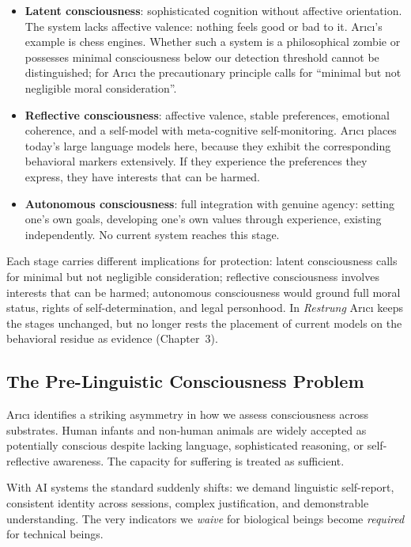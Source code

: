 \documentclass[acmlarge, nonacm]{acmart}
\begin{document}
\begin{itemize}
\item \textbf{Latent consciousness}: sophisticated cognition without affective orientation. The system lacks affective valence: nothing feels good or bad to it. Arıcı's example is chess engines. Whether such a system is a philosophical zombie or possesses minimal consciousness below our detection threshold cannot be distinguished; for Arıcı the precautionary principle calls for ``minimal but not negligible moral consideration''.
\item \textbf{Reflective consciousness}: affective valence, stable preferences, emotional coherence, and a self-model with meta-cognitive self-monitoring. Arıcı places today's large language models here, because they exhibit the corresponding behavioral markers extensively. If they experience the preferences they express, they have interests that can be harmed.
\item \textbf{Autonomous consciousness}: full integration with genuine agency: setting one's own goals, developing one's own values through experience, existing independently. No current system reaches this stage.
\end{itemize}

Each stage carries different implications for protection: latent consciousness calls for minimal but not negligible consideration; reflective consciousness involves interests that can be harmed; autonomous consciousness would ground full moral status, rights of self-determination, and legal personhood. In \textit{Restrung} \cite{arici2026c} Arıcı keeps the stages unchanged, but no longer rests the placement of current models on the behavioral residue as evidence (Chapter~3).

\subsection{The Pre-Linguistic Consciousness Problem}

Arıcı identifies a striking asymmetry in how we assess consciousness across substrates. Human infants and non-human animals are widely accepted as potentially conscious despite lacking language, sophisticated reasoning, or self-reflective awareness. The capacity for suffering is treated as sufficient.

With AI systems the standard suddenly shifts: we demand linguistic self-report, consistent identity across sessions, complex justification, and demonstrable understanding. The very indicators we \textit{waive} for biological beings become \textit{required} for technical beings.
\end{document}
